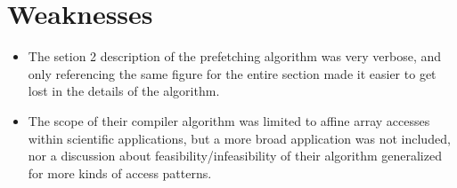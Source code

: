 \documentclass [12pt]{article}
\begin{document}
    \section{Weaknesses} %
    \label{sec:weaknesses}
        \begin{itemize}
            \item The setion 2 description of the prefetching algorithm was very verbose, and only referencing the same figure for the entire section made it easier to get lost in the details of the algorithm. 
            \item The scope of their compiler algorithm was limited to affine array accesses within scientific applications, but a more broad application was not included, nor a discussion about feasibility/infeasibility of their algorithm generalized for more kinds of access patterns. 
        \end{itemize}
\end{document}
